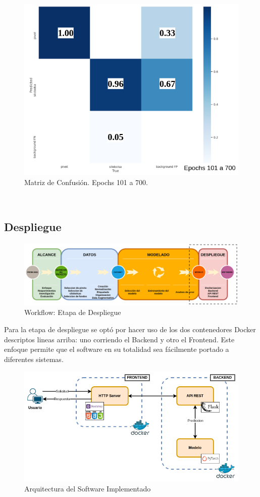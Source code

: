 \begin{figure}[t!]
    \centering
    \includegraphics[width=1\textwidth]{img/matriz_confusion_700.png}
    \caption{Matriz de Confusión. Epochs 101 a 700.}
    \label{fig:matriz-confusion-700}
\end{figure}\\

\newpage
\subsection{Despliegue}
\begin{figure}
    \centering
    \includegraphics[width=1.2\textwidth,center]{img/Wokflow - despliegue.drawio.png}
    \caption{Workflow: Etapa de Despliegue}
    \label{fig:workflow - despliegue}
\end{figure}
Para la etapa de despliegue se optó por hacer uso de los dos contenedores Docker descriptos lineas arriba: uno corriendo el Backend y otro el Frontend. Este enfoque permite que el software en su totalidad sea fácilmente portado a diferentes sistemas.

\begin{figure}
    \centering
    \includegraphics[width=1\textwidth,center]{img/BE - API - FE.drawio.png}
    \caption{Arquitectura del Software Implementado}
    \label{fig:be - api - fe}
\end{figure}
\newpage